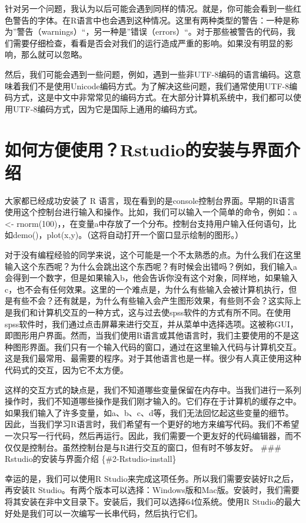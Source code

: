 \documentclass[
  oneside]{book}
\begin{document}
针对另一个问题，我认为以后可能会遇到同样的情况。就是，你可能会看到一些红色警告的字体。在R语言中也会遇到这种情况。这里有两种类型的警告：一种是称为''警告（warnings）``，另一种是''错误（errors）``。对于那些被警告的代码，我们需要仔细检查，看看是否会对我们的运行造成严重的影响。如果没有明显的影响，那么就可以忽略。

然后，我们可能会遇到一些问题，例如，遇到一些非UTF-8编码的语言编码。这意味着我们不是使用Unicode编码方式。为了解决这些问题，我们通常使用UTF-8编码方式，这是中文中非常常见的编码方式。在大部分计算机系统中，我们都可以使用UTF-8编码方式，因为它是国际上通用的编码方式。

\hypertarget{2-Rstudio}{%
\section{如何方便使用？Rstudio的安装与界面介绍}\label{2-Rstudio}}

大家都已经成功安装了 R
语言，现在看到的是console控制台界面。早期的R语言使用这个控制台进行输入和操作。比如，我们可以输入一个简单的命令，例如：a
\textless-
rnorm(100)，，在变量a中存放了一个分布。控制台支持用户输入任何语句，比如demo()，plot(x,y)。（这将自动打开一个窗口显示绘制的图形。）

对于没有编程经验的同学来说，这个可能是一个不太熟悉的点。为什么我们在这里输入这个东西呢？为什么会跳出这个东西呢？有时候会出错吗？例如，我们输入a会得到一个数字，但是如果输入b，他会告诉你没有这个对象，同样地，如果输入c，也不会有任何效果。这里的一个难点是，为什么有些输入会被计算机执行，但是有些不会？还有就是，为什么有些输入会产生图形效果，有些则不会？这实际上是我们和计算机交互的一种方式，这与过去使spss软件的方式有所不同。在使用spss软件时，我们通过点击屏幕来进行交互，并从菜单中选择选项。这被称GUI，即图形用户界面。然而，当我们使用R语言或其他语言时，我们主要使用的不是这种图形界面。我们只有一个输入代码的窗口，通过在这里输入代码与计算机交互。这是我们最常用、最需要的程序。对于其他语言也是一样。很少有人真正使用这种代码式的交互，因为它不太方便。

这样的交互方式的缺点是，我们不知道哪些变量保留在内存中。当我们进行一系列操作时，我们不知道哪些操作是我们刚才输入的。它们存在于计算机的缓存之中。如果我们输入了许多变量，如a、b、c、d等，我们无法回忆起这些变量的细节。因此，当我们学习R语言时，我们希望有一个更好的地方来编写代码。我们不希望一次只写一行代码，然后再运行。因此，我们需要一个更友好的代码编辑器，而不仅仅是控制台。虽然控制台是与R进行交互的窗口，但有时不够友好。
\#\#\# Rstudio的安装与界面介绍 \{\#2-Rstudio-install\}

幸运的是，我们可以使用R
Studio来完成这项任务。所以我们需要安装好R之后，再安装R
Studio。有两个版本可以选择：Windows版和Mac版。安装时，我们需要将其安装在非中文目录下。安装后，我们可以选择64位系统。使用R
Studio的最大好处是我们可以一次编写一长串代码，然后执行它们。
\end{document}
